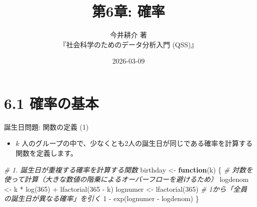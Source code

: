\documentclass[
  ignorenonframetext,
]{beamer}
\title{第6章: 確率}
\subtitle{今井耕介 著\\
『社会科学のためのデータ分析入門 (QSS)』}
\author{}
\date{\vspace{-2.5em}2026-03-09}
\newenvironment{Shaded}{\begin{snugshade}}{\end{snugshade}}
\newcommand{\CommentTok}[1]{\textcolor[rgb]{0.56,0.35,0.01}{\textit{#1}}}
\newcommand{\ControlFlowTok}[1]{\textcolor[rgb]{0.13,0.29,0.53}{\textbf{#1}}}
\newcommand{\DecValTok}[1]{\textcolor[rgb]{0.00,0.00,0.81}{#1}}
\newcommand{\FunctionTok}[1]{\textcolor[rgb]{0.00,0.00,0.00}{#1}}
\newcommand{\NormalTok}[1]{#1}
\newcommand{\OtherTok}[1]{\textcolor[rgb]{0.56,0.35,0.01}{#1}}
\newcommand{\SpecialCharTok}[1]{\textcolor[rgb]{0.00,0.00,0.00}{#1}}
\providecommand{\tightlist}{%
  \setlength{\itemsep}{0pt}\setlength{\parskip}{0pt}}
\begin{document}
\frame{\titlepage}

\hypertarget{ux78baux7387ux306eux57faux672c}{%
\section{6.1 確率の基本}\label{ux78baux7387ux306eux57faux672c}}

\begin{frame}[fragile]{誕生日問題: 関数の定義 (1)}
\protect\hypertarget{ux8a95ux751fux65e5ux554fux984c-ux95a2ux6570ux306eux5b9aux7fa9-1}{}
\begin{itemize}
\tightlist
\item
  \(k\)
  人のグループの中で、少なくとも2人の誕生日が同じである確率を計算する関数を定義します。
\end{itemize}

\scriptsize

\begin{Shaded}
\begin{Highlighting}[]
\CommentTok{\# 1. 誕生日が重複する確率を計算する関数}
\NormalTok{birthday }\OtherTok{\textless{}{-}} \ControlFlowTok{function}\NormalTok{(k) \{}
    \CommentTok{\# 対数を使って計算（大きな数値の階乗によるオーバーフローを避けるため）}
\NormalTok{    logdenom }\OtherTok{\textless{}{-}}\NormalTok{ k }\SpecialCharTok{*} \FunctionTok{log}\NormalTok{(}\DecValTok{365}\NormalTok{) }\SpecialCharTok{+} \FunctionTok{lfactorial}\NormalTok{(}\DecValTok{365} \SpecialCharTok{{-}}\NormalTok{ k)}
\NormalTok{    lognumer }\OtherTok{\textless{}{-}} \FunctionTok{lfactorial}\NormalTok{(}\DecValTok{365}\NormalTok{)}
    \CommentTok{\# 1から「全員の誕生日が異なる確率」を引く}
    \DecValTok{1} \SpecialCharTok{{-}} \FunctionTok{exp}\NormalTok{(lognumer }\SpecialCharTok{{-}}\NormalTok{ logdenom)}
\NormalTok{\}}
\end{Highlighting}
\end{Shaded}

\normalsize
\end{frame}
\end{document}
